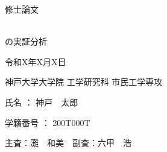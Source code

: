 \thispagestyle{empty}
\pagestyle{empty}
\begin{center}
\Huge{修士論文}

\vspace*{0.8cm}

\Huge{ \\の実証分析}\\

\vspace*{7.0cm} %


\huge{令和\textsf{X}年\textsf{X}月\textsf{X}日}


\vspace*{0.5cm}

\huge{神戸大学大学院 工学研究科 市民工学専攻}

\vspace*{1cm}

\huge{氏名 ： 神戸　太郎}

\vspace*{0.5cm}

\huge{学籍番号 ： \textsf{200T000T}}

\vspace*{1cm}

\large{主査：灘　和美　副査：六甲　浩}

\end{center}

